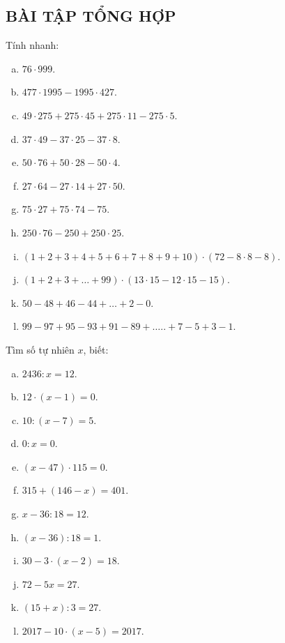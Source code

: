 \begin{bt}
\subsection{BÀI TẬP TỔNG HỢP}
\end{bt}   \begin{bt}
Tính nhanh:	
\begin{enumerate}[a)]
\item $76\cdot 999$. 
\item $477\cdot 1995-1995\cdot 427$. 
\item $49\cdot 275+275\cdot 45+275\cdot 11-275\cdot 5$.
\item $37 \cdot 49 - 37 \cdot 25 - 37 \cdot 8$.
\item $50 \cdot 76 + 50 \cdot 28 - 50 \cdot 4$.
\item $27 \cdot 64 - 27 \cdot 14 + 27 \cdot 50$.
\item $75 \cdot 27 + 75 \cdot 74 - 75$.
\item $250 \cdot 76 - 250 + 250 \cdot 25$.
\item $\left( 1+2+3+4+5+6+7+8+9+10 \right)\cdot \left( 72-8\cdot 8-8 \right)$.
\item $\left( 1+2+3+\ldots +99 \right)\cdot \left( 13\cdot 15-12\cdot 15-15 \right)$.
\item $50-48 + 46 - 44 + \ldots + 2 -0$.
\item $99-97+95-93+91-89+\ldots ..+7-5+3-1$. 
\end{enumerate}
\end{bt}   \begin{bt}
Tìm số tự nhiên $x$, biết:
\begin{multicols}{2}
\begin{enumerate}[a)]
\item $2436:x=12$.    
\item $12\cdot (x-1)=0$. 
\item $10:(x-7)=5$.
\item $0:x=0$.
\item $(x-47)\cdot 115=0$. 
\item$315+(146-x)=401$. 
\item $x-36:18=12$. 
\item $\left( x-36 \right):18=1$.   	
\item $30-3\cdot (x-2)=18$.
\item $72-5x=27$.
\item $(15+x):3=27$.
\item $2017-10\cdot (x-5)=2017$.
 \end{enumerate}
 \end{multicols}

\end{bt}
